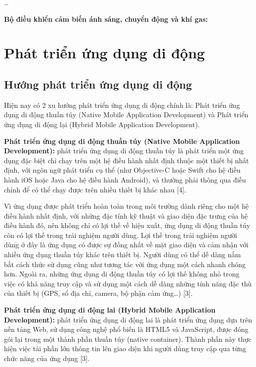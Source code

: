 \documentclass[11pt,a4paper,oneside]{book}
\begin{document}
…

\textbf{Bộ điều khiển cảm biến ánh sáng, chuyển động và khí gas:}

\newpage
\section{Phát triển ứng dụng di động}
\subsection{Hướng phát triển ứng dụng di động}
Hiện nay có 2 xu hướng phát triển ứng dụng di động chính là: Phát triển ứng dụng di động thuần túy (Native Mobile Application Development) và Phát triển ứng dụng di động lại (Hybrid Mobile Application Development).

\textbf{Phát triển ứng dụng di động thuần túy (Native Mobile Application Development):} phát triển ứng dụng di động thuần túy là phát triển một ứng dụng đặc biệt chỉ chạy trên một hệ điều hành nhất định thuộc một thiết bị nhất định, với ngôn ngữ phát triển cụ thể (như Objective-C hoặc Swift cho hệ điều hành iOS hoặc Java cho hệ điều hành Android), và thường phải thông qua điều chỉnh để có thể chạy được trên nhiều thiết bị khác nhau [4].

Vì ứng dụng được phát triển hoàn toàn trong môi trường dành riêng cho một hệ điều hành nhất định, với những đặc tính kỹ thuật và giao diện đặc trưng của hệ điều hành đó, nên không chỉ có lợi thế về hiệu xuất, ứng dụng di động thuần túy còn có lợi thế trong trải nghiệm người dùng. Lợi thế trong trải nghiệm người dùng ở đây là ứng dụng có được sự đồng nhất về mặt giao diện và cảm nhận với nhiều ứng dụng thuần túy khác trên thiết bị. Người dùng có thể dễ dàng nắm bắt cách thức sử dụng cũng như tương tác với ứng dụng một cách nhanh chóng hơn. Ngoài ra, những ứng dụng di động thuần túy có lợi thế không nhỏ trong việc có khả năng truy cập và sử dụng một cách dễ dàng những tính năng đặc thù của thiết bị (GPS, sổ địa chỉ, camera, bộ phận cảm ứng…) [3].

\textbf{Phát triển ứng dụng di động lai (Hybrid Mobile Application Development):} phát triển ứng dụng di động lai là phát triển ứng dụng dựa trên nền tảng Web, sử dụng công nghệ phổ biến là HTML5 và JavaScript, được đóng gói lại trong một thành phần thuần túy (native container). Thành phần này thực hiện việc tải phần lớn thông tin lên giao diện khi người dùng truy cập qua từng chức năng của ứng dụng [3].
\end{document}

